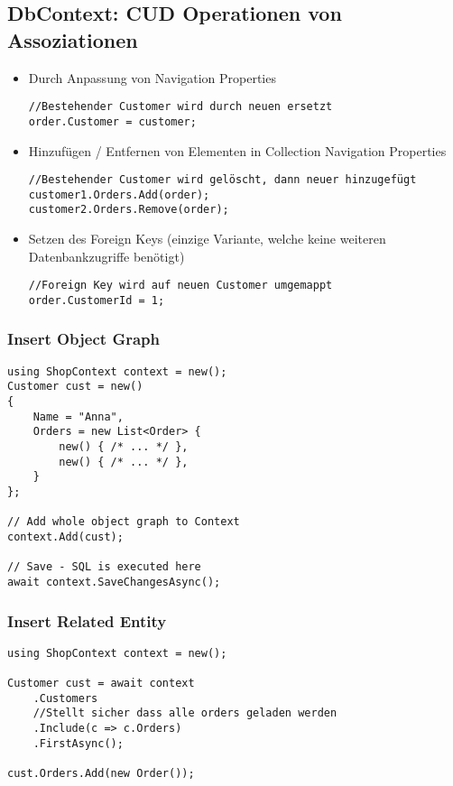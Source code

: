 \begin{multicols*}{2}
\subsection{DbContext: CUD Operationen von Assoziationen}
\begin{itemize}
    \item Durch Anpassung von Navigation Properties
    \begin{lstlisting}
//Bestehender Customer wird durch neuen ersetzt
order.Customer = customer;
    \end{lstlisting}
    \item Hinzufügen / Entfernen von Elementen in Collection Navigation Properties
    \begin{lstlisting}
//Bestehender Customer wird gelöscht, dann neuer hinzugefügt
customer1.Orders.Add(order);
customer2.Orders.Remove(order);
    \end{lstlisting}
    \item Setzen des Foreign Keys (einzige Variante, welche keine weiteren Datenbankzugriffe benötigt)
    \begin{lstlisting}
//Foreign Key wird auf neuen Customer umgemappt
order.CustomerId = 1;
    \end{lstlisting}
\end{itemize}
\subsubsection{Insert Object Graph}
\begin{lstlisting}
using ShopContext context = new();
Customer cust = new()
{
    Name = "Anna",
    Orders = new List<Order> {
        new() { /* ... */ },
        new() { /* ... */ },
    } 
};

// Add whole object graph to Context
context.Add(cust);
    
// Save - SQL is executed here
await context.SaveChangesAsync();
\end{lstlisting}
\subsubsection{Insert Related Entity}
\begin{lstlisting}
using ShopContext context = new();

Customer cust = await context
    .Customers
    //Stellt sicher dass alle orders geladen werden
    .Include(c => c.Orders)
    .FirstAsync(); 

cust.Orders.Add(new Order());
    

\end{lstlisting}
\end{multicols*}
